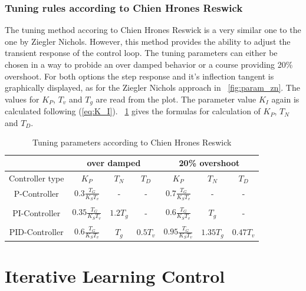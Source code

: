 \subsubsection{Tuning rules according to Chien Hrones Reswick}
The tuning method accoring to Chien Hrones Reswick is a very similar one to the one by Ziegler Nichols. However, this method provides the ability to adjust the transient response of the control loop. The tuning parameters can either be chosen in a way to probide an over damped behavior or a course providing 20\% overshoot.\cite{Reg_11}
For both options the step response and it's inflection tangent is graphically displayed, as for the Ziegler Nichols approach in \figurename~\ref{fig:param_zn}.
The values for $K_{P}$, $T_{v}$ and $T_{g}$ are read from the plot. The parameter value $K_{I}$ again is calculated following (\ref{eq:K_I}). \tablename~\ref{tab:param_chr} gives the formulas for calculation of $K_{P}$,  $T_{N}$ and $T_{D}$.

\begin{table}
  \centering
  \begin{tabular}{c|ccc|ccc}
    \toprule
     & \multicolumn{3}{c|}{over damped} & \multicolumn{3}{c}{20\% overshoot} \\
    \midrule
    Controller type & $K_{P}$ &  $T_{N}$ & $T_{D}$ & $K_{P}$ &  $T_{N}$ & $T_{D}$ \\
    \midrule
    P-Controller & $0.3\frac{T_{G}}{K_{S}T_{v}}$ & - & - & $0.7\frac{T_{G}}{K_{S}T_{v}}$ & - & - \\
    & & & & & & \\
    PI-Controller & $0.35\frac{T_{G}}{K_{S}T_{v}}$ & $1.2T_{g}$ & - & $0.6\frac{T_{G}}{K_{S}T_{v}}$ & $T_{g}$ & - \\
        & & & & & & \\
    PID-Controller & $0.6\frac{T_{G}}{K_{S}T_{v}}$ & $T_{g}$ & $0.5T_{v}$ & $0.95\frac{T_{G}}{K_{S}T_{v}}$ & $1.35T_{g}$ & $0.47T_{v}$\\
    \bottomrule
\end{tabular}
  \caption[Tuning parameters Chien Hrones Reswick]{Tuning parameters according to Chien Hrones Reswick}
  \label{tab:param_chr}
\end{table}

\section{Iterative Learning Control}
